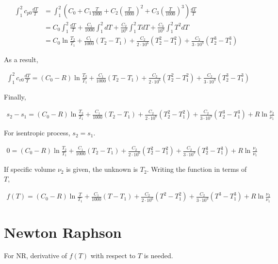 \documentclass{article}
\begin{document}
	\begin{align*}
		\int_1^2 c_{p0}\frac{dT}{T}
		&=
		\int_1^2 \left(C_0 + C_1\frac{T}{1000} + C_2\left(\frac{T}{1000}\right)^2 + C_3\left(\frac{T}{1000}\right)^3\right)\frac{dT}{T}\\
		&=
		C_0\int_1^2 \frac{dT}{T} + \frac{C_1}{1000}\int_1^2 dT + \frac{C_2}{10^6}\int_1^2 TdT + \frac{C_3}{10^9}\int_1^2 T^2dT\\
		&=
		C_0\ln\frac{T_2}{T_1} + \frac{C_1}{1000}(T_2 - T_1) + \frac{C_2}{2\cdot10^6}(T_2^2 - T_1^2) + \frac{C_2}{3\cdot10^9}(T_2^3 - T_1^3)
	\end{align*}

	As a result,

	\begin{align*}
		\int_1^2 c_{v0}\frac{dT}{T}
		=
		(C_0 - R)\ln\frac{T_2}{T_1} + \frac{C_1}{1000}(T_2 - T_1) + \frac{C_2}{2\cdot10^6}(T_2^2 - T_1^2) + \frac{C_2}{3\cdot10^9}(T_2^3 - T_1^3)
	\end{align*}

	Finally,

	\begin{align*}
		s_2 - s_1 = (C_0 - R)\ln\frac{T_2}{T_1} + \frac{C_1}{1000}(T_2 - T_1) + \frac{C_2}{2\cdot10^6}(T_2^2 - T_1^2) + \frac{C_2}{3\cdot10^9}(T_2^3 - T_1^3) + R\ln\frac{\nu_2}{\nu_1}
	\end{align*}

	For isentropic process, $s_2=s_1$.

	\begin{align*}
		0 = (C_0 - R)\ln\frac{T_2}{T_1} + \frac{C_1}{1000}(T_2 - T_1) + \frac{C_2}{2\cdot10^6}(T_2^2 - T_1^2) + \frac{C_2}{3\cdot10^9}(T_2^3 - T_1^3) + R\ln\frac{\nu_2}{\nu_1}
	\end{align*}

	If specific volume $\nu_2$ is given, the unknown is $T_2$. Writing the function in terms of $T$,

	\begin{align*}
		f(T) = (C_0 - R)\ln\frac{T}{T_1} + \frac{C_1}{1000}(T - T_1) + \frac{C_2}{2\cdot10^6}(T^2 - T_1^2) + \frac{C_2}{3\cdot10^9}(T^3 - T_1^3) + R\ln\frac{\nu_2}{\nu_1}
	\end{align*}

	\section{Newton Raphson}

	For NR, derivative of $f(T)$ with respect to $T$ is needed.
\end{document}
